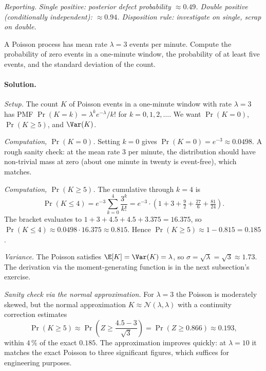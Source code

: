 \textit{Reporting.} \emph{Single positive: posterior defect
probability $\approx 0.49$. Double positive (conditionally
independent): $\approx 0.94$. Disposition rule: investigate on
single, scrap on double.}

\begin{exercise}
A Poisson process has mean rate $\lambda = 3$ events per minute.
Compute the probability of zero events in a one-minute window, the
probability of at least five events, and the standard deviation of
the count.
\end{exercise}

\paragraph{Solution.}
\textit{Setup.} The count $K$ of Poisson events in a one-minute
window with rate $\lambda = 3$ has PMF
$\Pr(K = k) = \lambda^{k} e^{-\lambda}/k!$ for
$k = 0, 1, 2, \ldots$. We want $\Pr(K = 0)$, $\Pr(K \geq 5)$, and
$\Var(K)$.

\textit{Computation, $\Pr(K = 0)$.} Setting $k = 0$ gives
$\Pr(K = 0) = e^{-3} \approx 0.0498$. A rough sanity check: at the
mean rate $3$ per minute, the distribution should have non-trivial
mass at zero (about one minute in twenty is event-free), which
matches.

\textit{Computation, $\Pr(K \geq 5)$.} The cumulative through
$k = 4$ is
\[
\Pr(K \leq 4) = e^{-3} \sum_{k=0}^{4} \frac{3^{k}}{k!}
= e^{-3} \cdot \left(1 + 3 + \tfrac{9}{2} + \tfrac{27}{6}
  + \tfrac{81}{24}\right).
\]
The bracket evaluates to $1 + 3 + 4.5 + 4.5 + 3.375 = 16.375$, so
$\Pr(K \leq 4) \approx 0.0498 \cdot 16.375 \approx 0.815$. Hence
$\Pr(K \geq 5) \approx 1 - 0.815 = 0.185$.

\textit{Variance.} The Poisson satisfies
$\E[K] = \Var(K) = \lambda$, so
$\sigma = \sqrt{\lambda} = \sqrt{3} \approx 1.73$. The derivation
via the moment-generating function is in the next subsection's
exercise.

\textit{Sanity check via the normal approximation.} For
$\lambda = 3$ the Poisson is moderately skewed, but the normal
approximation
$K \approx \mathcal{N}(\lambda, \lambda)$ with a continuity
correction estimates
\[
\Pr(K \geq 5) \approx \Pr\!\left(Z \geq \frac{4.5 - 3}{\sqrt{3}}\right)
= \Pr(Z \geq 0.866) \approx 0.193,
\]
within $4 \,\%$ of the exact $0.185$. The approximation improves
quickly: at $\lambda = 10$ it matches the exact Poisson to three
significant figures, which suffices for engineering purposes.

